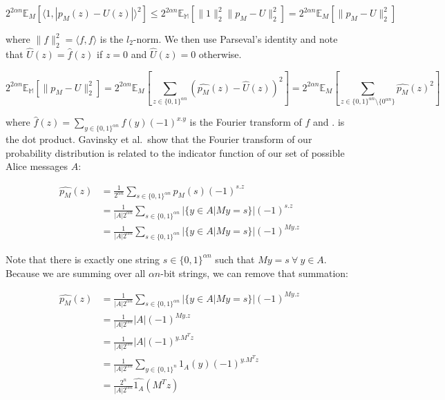 \documentclass[a4paper]{article}
\begin{document}
        $$2^{2\alpha n}\mathbb{E}_M[\langle 1, |p_M(z) - U(z)|\rangle^2] \leq 2^{2\alpha n}\mathbb{E_M}[\|1\|_2^2\|p_M - U\|_2^2] = 2^{2\alpha n}\mathbb{E}_M[\|p_M - U\|_2^2]$$

        where $\|f\|_2^2 = \langle f, f\rangle$ is the $l_2$-norm. We then use Parseval's identity and note that $\widehat{U}(z) = \widehat{f}(z)$ if $z = 0$ and $\widehat{U}(z) = 0$ otherwise.

        $$2^{2\alpha n}\mathbb{E_M}[\|p_M - U\|_2^2] = 2^{2\alpha n}\mathbb{E}_M\left[\sum_{z \in \{0, 1\}^{\alpha n}}(\widehat{p_M}(z) - \widehat{U}(z))^2\right] = 2^{2\alpha n}\mathbb{E}_M\left[\sum_{z \in \{0, 1\}^{\alpha n}\setminus\{0^{\alpha n}\}}\widehat{p_M}(z)^2\right]$$

        where $\widehat{f}(z) = \sum_{y \in \{0, 1\}^{\alpha n}}f(y)(-1)^{x.y}$ is the Fourier transform of $f$ and $.$ is the dot product. Gavinsky et al.~show that the Fourier transform of our probability distribution is related to the indicator function of our set of possible Alice messages $A$:

        \begin{align*}
            \widehat{p_M}(z) &= \frac{1}{2^{\alpha n}}\sum_{s \in \{0, 1\}^{\alpha n}}p_M(s)(-1)^{s.z}\\
            &= \frac{1}{|A|2^{\alpha n}}\sum_{s \in \{0, 1\}^{\alpha n}}|\{y \in A|My = s\}|(-1)^{s.z}\\
            &= \frac{1}{|A|2^{\alpha n}}\sum_{s \in \{0, 1\}^{\alpha n}}|\{y \in A|My = s\}|(-1)^{My.z}
        \end{align*}

        Note that there is exactly one string $s \in \{0, 1\}^{\alpha n}$ such that $My = s ~\forall~ y \in A$. Because we are summing over all $\alpha n$-bit strings, we can remove that summation:

        \begin{align*}
            \widehat{p_M}(z) &= \frac{1}{|A|2^{\alpha n}}\sum_{s \in \{0, 1\}^{\alpha n}}|\{y \in A|My = s\}|(-1)^{My.z}\\
            &= \frac{1}{|A|2^{\alpha n}}|A|(-1)^{My.z}\\
            &= \frac{1}{|A|2^{\alpha n}}|A|(-1)^{y.M^Tz}\\
            &= \frac{1}{|A|2^{\alpha n}}\sum_{y \in \{0, 1\}^n}1_A(y)(-1)^{y.M^Tz}\\
            &= \frac{2^n}{|A|2^{\alpha n}}\widehat{1_A}(M^Tz)
        \end{align*}
\end{document}
